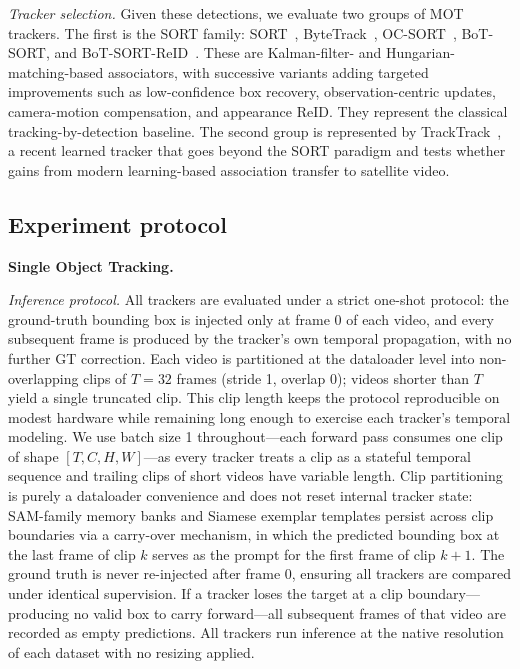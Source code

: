 \documentclass{article}
\newcommand{\subhead}[1]{\noindent\textbf{#1.}}
\newcommand{\minihead}[1]{\noindent\textit{#1.}}
\begin{document}
\textit{Tracker selection.}
Given these detections, we evaluate two groups of MOT trackers. The first is the SORT family: SORT~\citep{bewley2016sort}, ByteTrack~\citep{zhang2022bytetrack}, OC-SORT~\citep{cao2023ocsort}, BoT-SORT, and BoT-SORT-ReID~\citep{aharon2022botsort}. These are Kalman-filter- and Hungarian-matching-based associators, with successive variants adding targeted improvements such as low-confidence box recovery, observation-centric updates, camera-motion compensation, and appearance ReID. They represent the classical tracking-by-detection baseline. The second group is represented by TrackTrack~\citep{kim2025tracktrack}, a recent learned tracker that goes beyond the SORT paradigm and tests whether gains from modern learning-based association transfer to satellite video.



\subsection{Experiment protocol}
%
\subhead{Single Object Tracking} 

\minihead{Inference protocol} All trackers are evaluated under a strict
one-shot protocol: the ground-truth bounding box is injected only at frame 0 of
each video, and every subsequent frame is produced by the tracker's own temporal
propagation, with no further GT correction. Each video is partitioned at the
dataloader level into non-overlapping clips of $T{=}32$ frames (stride 1,
overlap 0); videos shorter than $T$ yield a single truncated clip. This clip
length keeps the protocol reproducible on modest hardware while remaining long
enough to exercise each tracker's temporal modeling. We use batch size 1
throughout---each forward pass consumes one clip of shape $[T,C,H,W]$---as every
tracker treats a clip as a stateful temporal sequence and trailing clips of
short videos have variable length. Clip partitioning is purely a dataloader
convenience and does not reset internal tracker state: SAM-family memory banks
and Siamese exemplar templates persist across clip boundaries via a carry-over
mechanism, in which the predicted bounding box at the last frame of clip $k$
serves as the prompt for the first frame of clip $k{+}1$. The ground truth is
never re-injected after frame 0, ensuring all trackers are compared under
identical supervision. If a tracker loses the target at a clip
boundary---producing no valid box to carry forward---all subsequent frames of
that video are recorded as empty predictions. All trackers run inference at the
native resolution of each dataset with no resizing applied.
\end{document}
